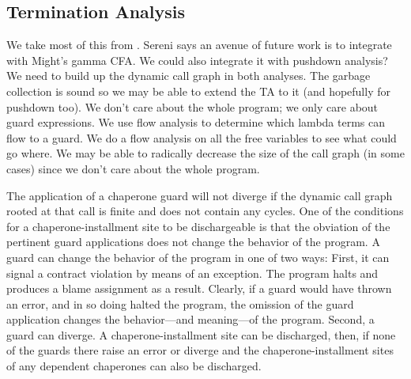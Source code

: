 \subsection{Termination Analysis}

We take most of this from \cite{sereni2007termination}.
Sereni says an avenue of future work is to integrate with Might's gamma CFA.
We could also integrate it with pushdown analysis?
We need to build up the dynamic call graph in both analyses.
The garbage collection is sound so we may be able to extend the TA to it (and hopefully for pushdown too).
We don't care about the whole program; we only care about guard expressions.
We use flow analysis to determine which lambda terms can flow to a guard.
We do a flow analysis on all the free variables to see what could go where.
We may be able to radically decrease the size of the call graph (in some cases) since we don't care about the whole program.

The application of a chaperone guard will not diverge if the dynamic call graph rooted at that call is finite and does not contain any cycles.
One of the conditions for a chaperone-installment site to be dischargeable is that the obviation of the pertinent guard applications does not change the behavior of the program.
A guard can change the behavior of the program in one of two ways:
First, it can signal a contract violation by means of an exception.
The program halts and produces a blame assignment as a result.
Clearly, if a guard would have thrown an error, and in so doing halted the program, the omission of the guard application changes the behavior---and meaning---of the program.
Second, a guard can diverge.
A chaperone-installment site can be discharged, then, if none of the guards there raise an error or diverge and the chaperone-installment sites of any dependent chaperones can also be discharged.

